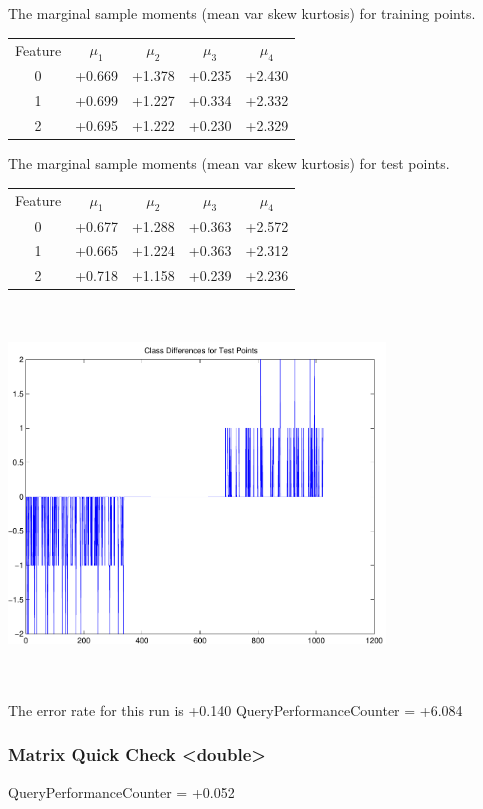 \documentclass[9pt]{article}
\theoremstyle{plain}
\theoremstyle{definition}
\theoremstyle{remark}
\numberwithin{equation}{section}
\begin{document}
The marginal sample moments (mean var skew kurtosis) for training points.\newline
\begin{tabular}{ c |  c  c  c  c}
Feature & $\mu_1$ & $\mu_2$ & $\mu_3$ & $\mu_4$ \\
0 & +0.669 & +1.378 & +0.235& +2.430 \\
\hline
1 & +0.699 & +1.227 & +0.334& +2.332 \\
\hline
2 & +0.695 & +1.222 & +0.230& +2.329 \\
\hline
\end{tabular}
\newline
The marginal sample moments (mean var skew kurtosis) for test points.\newline
\begin{tabular}{ c | c  c  c  c}
Feature & $\mu_1$ & $\mu_2$ & $\mu_3$ & $\mu_4$ \\
0 & +0.677 & +1.288 & +0.363& +2.572\\
\hline
1 & +0.665 & +1.224 & +0.363& +2.312\\
\hline
2 & +0.718 & +1.158 & +0.239& +2.236\\
\hline
\end{tabular}\newline
\includegraphics[width=10.0cm,height=10.0cm]{classDiffs.pdf}

The error rate for this run is +0.140\newline
QueryPerformanceCounter  =  +6.084
\subsubsection{Matrix Quick Check <double>}
QueryPerformanceCounter  =  +0.052
\end{document}
